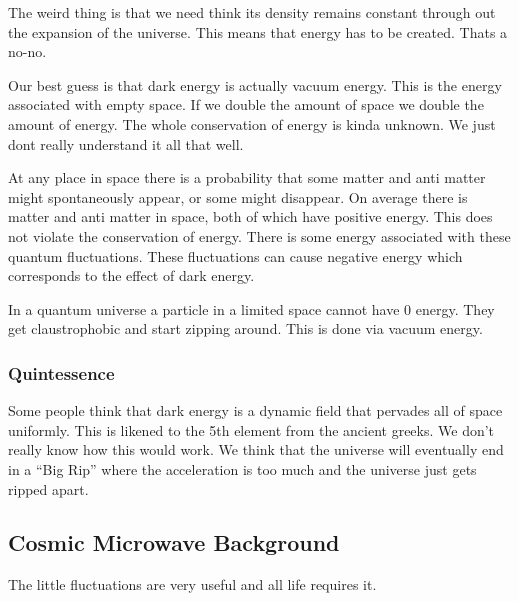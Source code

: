\documentclass{article}
\begin{document}
The weird thing is that we need think its density remains constant through out the expansion of the universe. This means that energy has to be created. Thats a no-no.

Our best guess is that dark energy is actually vacuum energy. This is the energy associated with empty space. If we double the amount of space we double the amount of energy. The whole conservation of energy is kinda unknown. We just dont really understand it all that well.

At any place in space there is a probability that some matter and anti matter might spontaneously appear, or some might disappear. On average there is matter and anti matter in space, both of which have positive energy. This does not violate the conservation of energy. There is some energy associated with these quantum fluctuations. These fluctuations can cause negative energy which corresponds to the effect of dark energy.

In a quantum universe a particle in a limited space cannot have 0 energy. They get claustrophobic and start zipping around. This is done via vacuum energy.

\subsubsection*{Quintessence}
\label{ssub:quintessence}
Some people think that dark energy is a dynamic field that pervades all of space uniformly. This is likened to the 5th element from the ancient greeks. We don't really know how this would work. We think that the universe will eventually end in a ``Big Rip'' where the acceleration is too much and the universe just gets ripped apart.

\subsection*{Cosmic Microwave Background}
\label{sub:cosmic_microwave_background}
The little fluctuations are very useful and all life requires it.
\end{document}
